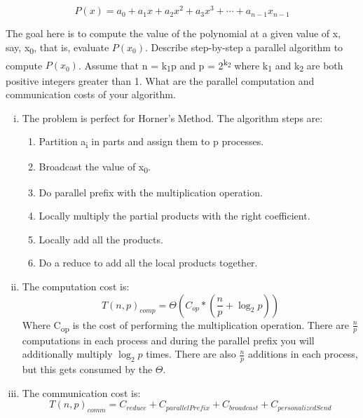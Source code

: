 \documentclass{article}
\begin{document}
    \begin{equation}
        P(x) = a_{0} + a_{1}x + a_{2}x^2 + a_{3}x^3 + \cdots + a_{n-1}x_{n-1}
    \end{equation}

    The goal here is to compute the value of the polynomial at a given value of x, say, x\textsubscript{0}, that is, evaluate $P(x_{0})$.
    Describe step-by-step a parallel algorithm to compute $P(x_{0})$. Assume that n = k\textsubscript{1}p and p = 2\textsuperscript{k\textsubscript{{2}}} where k\textsubscript{1}
    and k\textsubscript{2} are both positive integers greater than 1. What are the parallel computation and communication
    costs of your algorithm.

    \begin{enumerate}[i.]
        \item The problem is perfect for Horner's Method. The algorithm steps are:
            \begin{enumerate}
                \item Partition a\textsubscript{i} in parts and assign them to p processes.
                \item Broadcast the value of x\textsubscript{0}.
                \item Do parallel prefix with the multiplication operation.
                \item Locally multiply the partial products with the right coefficient.
                \item Locally add all the products.
                \item Do a reduce to add all the local products together.
            \end{enumerate}
        \item The computation cost is:
            \begin{equation}
                {T(n,p)}_{comp} = \Theta(C_{op} * (\frac{n}{p} + \log_{2} p))
            \end{equation}
            Where C\textsubscript{op} is the cost of performing the multiplication operation. 
            There are $\frac{n}{p}$ computations in each process and during the parallel prefix you will additionally multiply
            $\log_{2}p$ times. There are also $\frac{n}{p}$ additions in each process, but this gets consumed by the $\Theta$.
        \item The communication cost is:
            \begin{equation}
                {T(n,p)}_{comm} = C_{reduce} + C_{parallelPrefix} + C_{broadcast} + C_{personalizedSend}
            \end{equation}


\end{enumerate}
\end{document}
